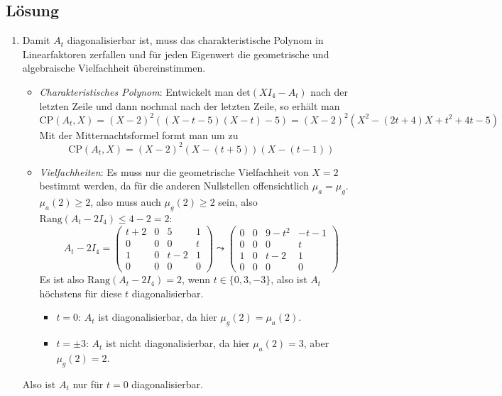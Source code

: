 \subsection{Lösung}
\begin{enumerate}
	\item Damit \( A_t \) diagonalisierbar ist, muss das charakteristische Polynom in Linearfaktoren zerfallen und für jeden Eigenwert die geometrische und algebraische Vielfachheit übereinstimmen.
	\begin{itemize}
	 	\item \emph{Charakteristisches Polynom}: Entwickelt man \( \text{det}(XI_4 - A_t) \) nach der letzten Zeile und dann nochmal nach der letzten Zeile, so erhält man
	 	\begin{equation*}
	 	 	\text{CP}(A_t, X) = (X-2)^2((X-t-5)(X-t)-5) = (X-2)^2(X^2-(2t+4)X + t^2 + 4t -5)
	 	 \end{equation*} 
	 	 Mit der Mitternachtsformel formt man um zu
	 	 \begin{equation*}
	 	 	\text{CP}(A_t, X) = (X - 2)^2(X - (t+5))(X - (t - 1))
	 	 \end{equation*}

	 	 \item \emph{Vielfachheiten}: Es muss nur die geometrische Vielfachheit von \( X=2 \) bestimmt werden, da für die anderen Nullstellen offensichtlich \( \mu_a = \mu_g \). \\
	 	 \( \mu_a(2) \geq 2 \), also muss auch \( \mu_g(2) \geq 2 \) sein, also \( \text{Rang}(A_t - 2I_4) \leq 4-2 = 2 \):
	 	 \begin{equation*}
	 	 	A_t-2I_4 = \begin{pmatrix}
	 	 		t+2 & 0 & 5 & 1 \\
	 	 		0 & 0 & 0 & t \\
	 	 		1 & 0 & t-2 & 1 \\
	 	 		0 & 0 & 0 & 0
	 	 	\end{pmatrix} \leadsto \begin{pmatrix}
	 	 		0 & 0 & 9-t^2 & -t-1 \\
	 	 		0 & 0 & 0 & t \\
	 	 		1 & 0 & t-2 & 1 \\
	 	 		0 & 0 & 0 & 0
	 	 	\end{pmatrix}
	 	 \end{equation*}
	 	 Es ist also \( \text{Rang}(A_t - 2I_4) = 2 \), wenn \( t \in \{ 0, 3, -3 \} \), also ist \( A_t \) höchstens für diese \( t \) diagonalisierbar.
	 	 \begin{itemize}
	 	 	\item \( t = 0 \): \( A_t \) ist diagonalisierbar, da hier \( \mu_g(2) = \mu_a(2) \).
	 	 	\item \( t = \pm 3 \): \( A_t \) ist nicht diagonalisierbar, da hier \( \mu_a(2)=3 \), aber \( \mu_g(2) = 2 \). 
	 	 \end{itemize}
	 \end{itemize}
	 Also ist \( A_t \) nur für \( t = 0 \) diagonalisierbar.


\end{enumerate}
